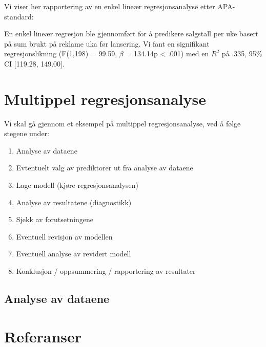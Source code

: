 \documentclass[
]{article}
\begin{document}
Vi viser her rapportering av en enkel lineær regresjonsanalyse etter
APA-standard:

En enkel lineær regresjon ble gjennomført for å predikere salgstall per
uke basert på sum brukt på reklame uka før lansering. Vi fant en
signifikant regresjonslikning (F(1,198) = 99.59, \(\beta\) = 134.14p
\textless{} .001) med en \(R^2\) på .335, 95\% CI {[}119.28, 149.00{]}.

\hypertarget{multippel-regresjonsanalyse}{%
\section{Multippel
regresjonsanalyse}\label{multippel-regresjonsanalyse}}

Vi skal gå gjennom et eksempel på multippel regresjonsanalyse, ved å
følge stegene under:

\begin{enumerate}
\def\labelenumi{\arabic{enumi}.}
\item
  Analyse av dataene
\item
  Evtentuelt valg av prediktorer ut fra analyse av dataene
\item
  Lage modell (kjøre regresjonsanalysen)
\item
  Analyse av resultatene (diagnostikk)
\item
  Sjekk av forutsetningene
\item
  Eventuell revisjon av modellen
\item
  Eventuell analyse av revidert modell
\item
  Konklusjon / oppsummering / rapportering av resultater
\end{enumerate}

\hypertarget{analyse-av-dataene}{%
\subsection{Analyse av dataene}\label{analyse-av-dataene}}

\hypertarget{referanser}{%
\section*{Referanser}\label{referanser}}
\end{document}
